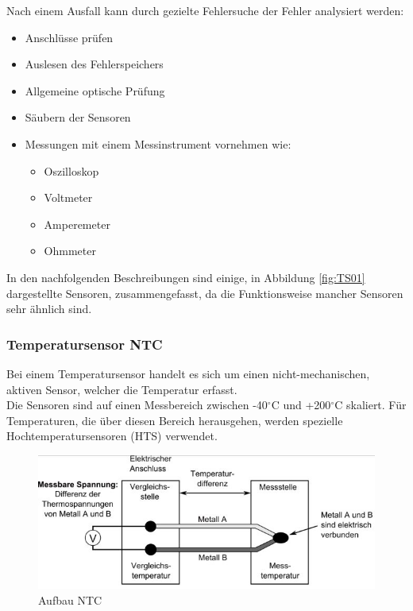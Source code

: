	        Nach einem Ausfall kann durch gezielte Fehlersuche der Fehler analysiert werden:
	
	        \begin{itemize}
	            \item Anschlüsse prüfen
	            \item Auslesen des Fehlerspeichers
	            \item Allgemeine optische Prüfung
	            \item Säubern der Sensoren
	            \item Messungen mit einem Messinstrument vornehmen wie:
	            \begin{itemize}
	                \item Oszilloskop 
	                \item Voltmeter
	                \item Amperemeter
	                \item Ohmmeter	
	            \end{itemize}
	            
	        \end{itemize}
	
			In den nachfolgenden Beschreibungen sind einige, in Abbildung \ref{fig:TS01} dargestellte Sensoren, zusammengefasst, da die Funktionsweise mancher Sensoren sehr ähnlich sind.
			
	        \subsubsection{Temperatursensor NTC}
				Bei einem Temperatursensor handelt es sich um einen nicht-mechanischen, aktiven	Sensor, welcher die Temperatur erfasst.\\
	            Die Sensoren sind auf einen Messbereich zwischen -40$^\circ$C und +200$^\circ$C skaliert.
	            Für Temperaturen, die über diesen Bereich herausgehen, werden spezielle Hochtemperatursensoren (HTS) verwendet.
	
	            \begin{figure}[h]
				
		        	\includegraphics[width=\textwidth]{aufbau_ntc.png}
		            \caption[www.kfztech.de/kfztechnik/elo/sensoren/ntc.htm]{Aufbau NTC}
		            \label{fig:TS02}
	            
				\end{figure}
	
